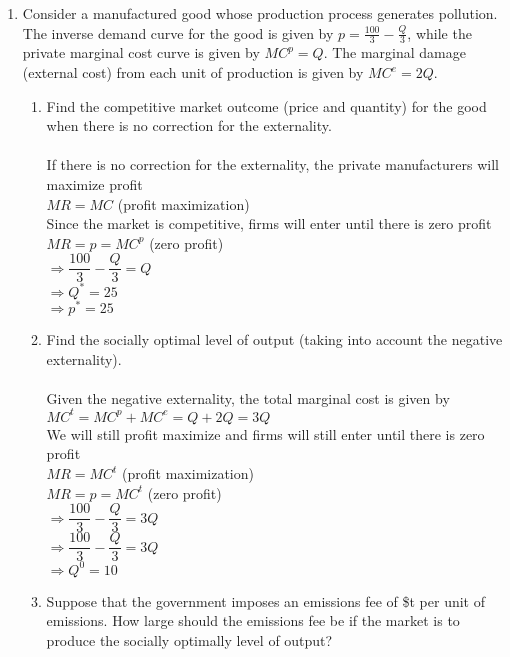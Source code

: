 \documentclass[11pt]{article}
\begin{document}
\begin{enumerate}
\begin{enumerate}
	\end{enumerate}
\pagebreak
\item Consider a manufactured good whose production process generates pollution. The inverse demand curve for the good is given by $p=\frac{100}{3}-\frac{Q}{3}$, while the private marginal cost curve is given by $MC^{p}=Q$. The marginal damage (external cost) from each unit of production is given by $MC^{e}=2Q$.
	\begin{enumerate}
	\item Find the competitive market outcome (price and quantity) for the good when there is no correction for the externality.
	\smallskip\\\\
	If there is no correction for the externality, the private manufacturers will maximize profit\\
	$MR=MC$ (profit maximization)\\
	Since the market is competitive, firms will enter until there is zero profit\\
	$MR=p=MC^p$ (zero profit)\\
	$\Rightarrow\dfrac{100}{3}-\dfrac{Q}{3}=Q$\\
	$\Rightarrow Q^*=25$\\
	$\Rightarrow p^*=25$\\
    \item Find the socially optimal level of output (taking into account the negative externality).
	\smallskip\\\\
	Given the negative externality, the total marginal cost is given by\\
	$MC^t=MC^p+MC^e=Q+2Q=3Q$\\
	We will still profit maximize and firms will still enter until there is zero profit\\
	$MR=MC^t$ (profit maximization)\\
	$MR=p=MC^t$ (zero profit)\\
	$\Rightarrow\dfrac{100}{3}-\dfrac{Q}{3}=3Q$\\
	$\Rightarrow\dfrac{100}{3}-\dfrac{Q}{3}=3Q$\\
	$\Rightarrow Q^0=10$\\
	\item Suppose that the government imposes an emissions fee of \$t per unit of emissions. How large should the emissions fee be if the market is to produce the socially optimally level of output?
	\smallskip\\\\

\end{enumerate}
\end{enumerate}
\end{document}

